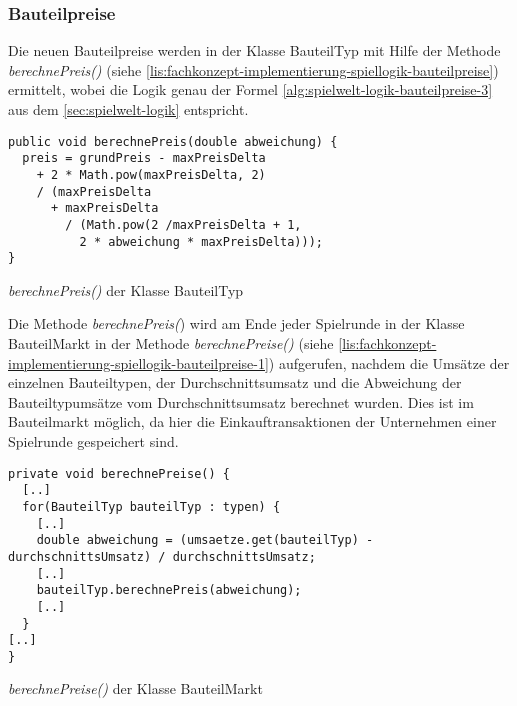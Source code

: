 \subsubsection{Bauteilpreise}
\label{subsub:fachkonzept-implementierung-spiellogik-bauteilreise}

Die neuen Bauteilpreise werden in der Klasse BauteilTyp mit Hilfe der Methode \textit{berechnePreis()} (siehe \ref{lis:fachkonzept-implementierung-spiellogik-bauteilpreise}) ermittelt, wobei die Logik genau der Formel \ref{alg:spielwelt-logik-bauteilpreise-3} aus dem \ref{sec:spielwelt-logik} entspricht.

\begin{programm}[htbp]
\begin{lstlisting}[breaklines=true]
public void berechnePreis(double abweichung) {
  preis = grundPreis - maxPreisDelta
    + 2 * Math.pow(maxPreisDelta, 2)
    / (maxPreisDelta
	  + maxPreisDelta 
	    / (Math.pow(2 /maxPreisDelta + 1,
	      2 * abweichung * maxPreisDelta)));
}	
\end{lstlisting}
\caption{\textit{berechnePreis()} der Klasse BauteilTyp\label{lis:fachkonzept-implementierung-spiellogik-bauteilpreise}}
\end{programm}

Die Methode \textit{berechnePreis(}) wird am Ende jeder Spielrunde in der Klasse BauteilMarkt in der Methode \textit{berechnePreise()} (siehe \ref{lis:fachkonzept-implementierung-spiellogik-bauteilpreise-1}) aufgerufen, nachdem die Umsätze der einzelnen Bauteiltypen, der Durchschnittsumsatz und die Abweichung der Bauteiltypumsätze vom Durchschnittsumsatz berechnet wurden. Dies ist im Bauteilmarkt möglich, da hier die Einkauftransaktionen der Unternehmen einer Spielrunde gespeichert sind.

\begin{programm}[htbp]
\begin{lstlisting}[breaklines=true]
private void berechnePreise() {
  [..]
  for(BauteilTyp bauteilTyp : typen) {
    [..]
    double abweichung = (umsaetze.get(bauteilTyp) - durchschnittsUmsatz) / durchschnittsUmsatz;
	[..]
	bauteilTyp.berechnePreis(abweichung);
	[..]
  }
[..]
}
\end{lstlisting}
\caption{\textit{berechnePreise()} der Klasse BauteilMarkt\label{lis:fachkonzept-implementierung-spiellogik-bauteilpreise-1}}
\end{programm}
